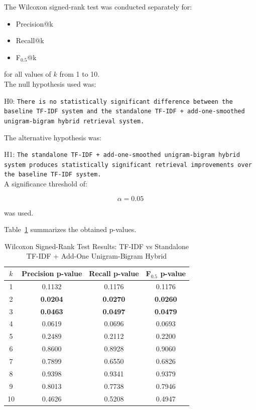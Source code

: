The Wilcoxon signed-rank test was conducted separately for:

\begin{itemize}
    \item Precision@k
    \item Recall@k
    \item F$_{0.5}$@k
\end{itemize}

for all values of $k$ from 1 to 10.\\

The null hypothesis used was:

H0: \texttt{There is no statistically significant difference between the baseline TF-IDF system and the standalone TF-IDF + add-one-smoothed unigram-bigram hybrid retrieval system.}

The alternative hypothesis was:

H1: \texttt{The standalone TF-IDF + add-one-smoothed unigram-bigram hybrid system produces statistically significant retrieval improvements over the baseline TF-IDF system.}\\

A significance threshold of:

\[
\alpha = 0.05
\]

was used.

Table~\ref{tab:wilcoxon_bigram_smoothing_results} summarizes the obtained p-values.

\begin{table}[H]
\centering
\caption{Wilcoxon Signed-Rank Test Results: TF-IDF vs Standalone TF-IDF + Add-One Unigram-Bigram Hybrid}
\label{tab:wilcoxon_bigram_smoothing_results}
\begin{tabular}{|c|c|c|c|}
\hline
$k$ & Precision p-value & Recall p-value & F$_{0.5}$ p-value \\
\hline
1 & 0.1132 & 0.1176 & 0.1176 \\
2 & \textbf{0.0204} & \textbf{0.0270} & \textbf{0.0260} \\
3 & \textbf{0.0463} & \textbf{0.0497} & \textbf{0.0479} \\
4 & 0.0619 & 0.0696 & 0.0693 \\
5 & 0.2489 & 0.2112 & 0.2200 \\
6 & 0.8600 & 0.8928 & 0.9060 \\
7 & 0.7899 & 0.6550 & 0.6826 \\
8 & 0.9398 & 0.9341 & 0.9379 \\
9 & 0.8013 & 0.7738 & 0.7946 \\
10 & 0.4626 & 0.5208 & 0.4947 \\
\hline
\end{tabular}
\end{table}

